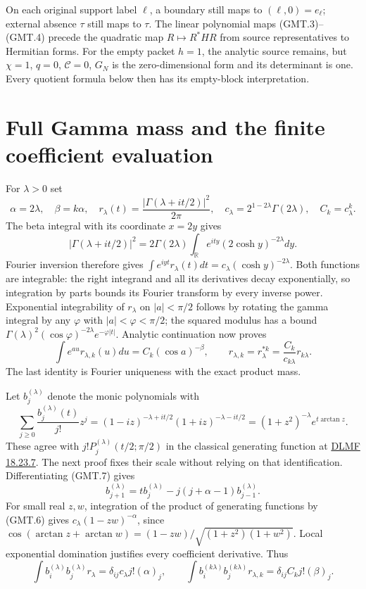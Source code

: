 \documentclass[11pt]{article}
\newcommand{\R}{\mathbb R}
\begin{document}
On each original support label $\ell$, a boundary still maps to
$(\ell,0)=e_\ell$; external absence $\tau$ still maps to $\tau$.
The linear polynomial maps (GMT.3)--(GMT.4) precede the quadratic map
$R\mapsto R^*H R$ from source representatives to Hermitian forms.
For the empty packet $h=1$, the analytic source remains, but
$\chi=1$, $q=0$, $\mathcal C=0$, $G_N$ is the zero-dimensional
form and its determinant is one. Every quotient formula below then
has its empty-block interpretation.

\section{Full Gamma mass and the finite coefficient evaluation}

For $\lambda>0$ set
\[
 \alpha=2\lambda,\quad \beta=k\alpha,\quad
 r_\lambda(t)=\frac{|\Gamma(\lambda+it/2)|^2}{2\pi},\quad
 c_\lambda=2^{1-2\lambda}\Gamma(2\lambda),\quad C_k=c_\lambda^k.
                                                                    \tag{GMT.5}
\]
The beta integral with its coordinate $x=2y$ gives
\[
 |\Gamma(\lambda+it/2)|^2
 =2\Gamma(2\lambda)\int_\R e^{ity}(2\cosh y)^{-2\lambda}dy.
\]
Fourier inversion therefore gives
$\int e^{iyt}r_\lambda(t)dt=c_\lambda(\cosh y)^{-2\lambda}$.
Both functions are integrable: the right integrand and all its
derivatives decay exponentially, so integration by parts bounds its
Fourier transform by every inverse power. Exponential integrability
of $r_\lambda$ on $|a|<\pi/2$ follows by rotating the gamma integral
by any $\varphi$ with $|a|<\varphi<\pi/2$; the squared modulus
has a bound $\Gamma(\lambda)^2(\cos\varphi)^{-2\lambda}
e^{-\varphi|t|}$. Analytic continuation now proves
\[
 \int e^{a u}r_{\lambda,k}(u)du=C_k(\cos a)^{-\beta},\qquad
 r_{\lambda,k}=r_\lambda^{*k}
             =\frac{C_k}{c_{k\lambda}}r_{k\lambda}.             \tag{GMT.6}
\]
The last identity is Fourier uniqueness with the exact product mass.

Let $b_j^{(\lambda)}$ denote the monic polynomials with
\[
 \sum_{j\ge0}\frac{b_j^{(\lambda)}(t)}{j!}z^j
 =(1-iz)^{-\lambda+it/2}(1+iz)^{-\lambda-it/2}
 =(1+z^2)^{-\lambda}e^{t\arctan z}.                             \tag{GMT.7}
\]
These agree with $j!P_j^{(\lambda)}(t/2;\pi/2)$ in the classical
generating function at
\href{https://dlmf.nist.gov/18.23.E7}{DLMF 18.23.7}.
The next proof fixes their scale without relying on that identification.
Differentiating (GMT.7) gives
\[
 b_{j+1}^{(\lambda)}=t b_j^{(\lambda)}
              -j(j+\alpha-1)b_{j-1}^{(\lambda)}.
\]
For small real $z,w$, integration of the product of generating
functions by (GMT.6) gives $c_\lambda(1-zw)^{-\alpha}$, since
$\cos(\arctan z+\arctan w)=(1-zw)/
\sqrt{(1+z^2)(1+w^2)}$. Local exponential domination justifies
every coefficient derivative. Thus
\[
 \int b_i^{(\lambda)}b_j^{(\lambda)}r_\lambda
 =\delta_{ij}c_\lambda j!(\alpha)_j,
 \qquad
 \int b_i^{(k\lambda)}b_j^{(k\lambda)}r_{\lambda,k}
 =\delta_{ij}C_kj!(\beta)_j.                                   \tag{GMT.8}
\]
\end{document}
